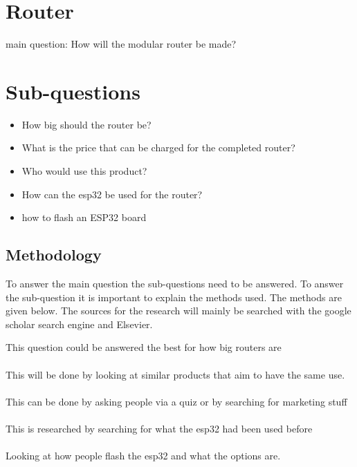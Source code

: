 


\section{Router}
main question: How will the modular router be made?

\section{Sub-questions}
\begin{itemize}
    \item How big should the router be?
    \item What is the price that can be charged for the completed router?
    \item Who would use this product?
    \item How can the esp32 be used for the router?\cite{esp32_monitoring}
    \item how to flash an ESP32 board\cite{FlashingESP32}
\end{itemize}

\subsection{Methodology}
To answer the main question the sub-questions need to be answered. To answer the sub-question it is important to explain the methods used. The methods are given below. The sources for the research will mainly be searched with the google scholar search engine and Elsevier. 

This question could be answered the best for how big routers are\\\\
This will be done by looking at similar products that aim to have the same use.\\\\
This can be done by asking people via a quiz or by searching for marketing stuff\\\\
This is researched by searching for what the esp32 had been used before\\\\
Looking at how people flash the esp32 and what the options are.
\\\\


